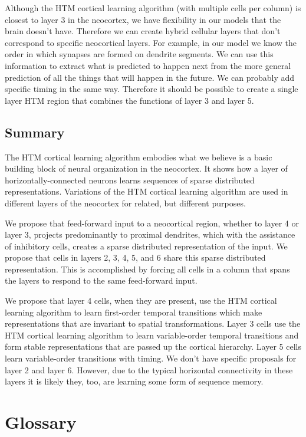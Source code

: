 \documentclass{report}
\begin{document}
Although the HTM cortical learning algorithm (with multiple cells per
column) is closest to layer 3 in the neocortex, we have flexibility in
our models that the brain doesn't have. Therefore we can create hybrid
cellular layers that don't correspond to specific neocortical
layers. For example, in our model we know the order in which synapses
are formed on dendrite segments. We can use this information to
extract what is predicted to happen next from the more general
prediction of all the things that will happen in the future. We can
probably add specific timing in the same way. Therefore it should be
possible to create a single layer HTM region that combines the
functions of layer 3 and layer 5.

\section*{Summary}


The HTM cortical learning algorithm embodies what we believe is a
basic building block of neural organization in the neocortex. It shows
how a layer of horizontally-connected neurons learns sequences of
sparse distributed representations. Variations of the HTM cortical
learning algorithm are used in different layers of the neocortex for
related, but different purposes.

We propose that feed-forward input to a neocortical region, whether to
layer 4 or layer 3, projects predominantly to proximal dendrites,
which with the assistance of inhibitory cells, creates a sparse
distributed representation of the input. We propose that cells in
layers 2, 3, 4, 5, and 6 share this sparse distributed
representation. This is accomplished by forcing all cells in a column
that spans the layers to respond to the same feed-forward input.

We propose that layer 4 cells, when they are present, use the HTM
cortical learning algorithm to learn first-order temporal transitions
which make representations that are invariant to spatial
transformations. Layer 3 cells use the HTM cortical learning algorithm
to learn variable-order temporal transitions and form stable
representations that are passed up the cortical hierarchy. Layer 5
cells learn variable-order transitions with timing. We don't have
specific proposals for layer 2 and layer 6. However, due to the
typical horizontal connectivity in these layers it is likely they,
too, are learning some form of sequence memory.

\chapter*{Glossary}
\label{glossary}
\end{document}
